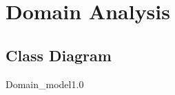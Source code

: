 \section{Domain Analysis}


\subsection{Class Diagram}
\begin{myfigure}{Domain_model}{1.0}%
	\caption{Class diagram. Showing the domain as it is.}
	\label{fig:domain-model}
\end{myfigure}

